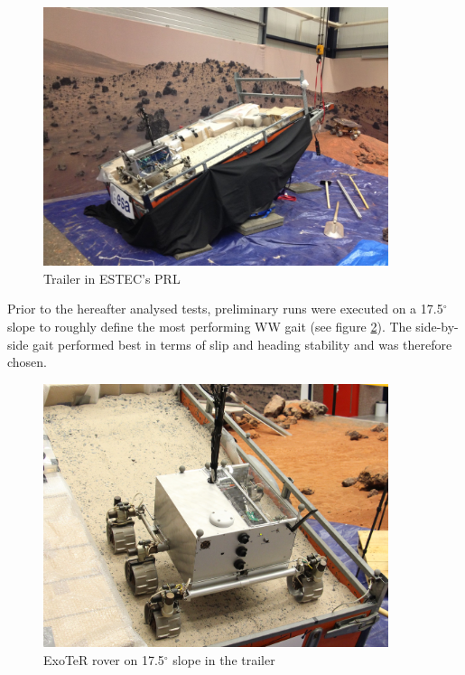 \documentclass[a4paper,twocolumn]{esapub2005} %
\begin{document}
\begin{figure}[h!]
    \centering
    \includegraphics[width=0.9\textwidth]{trailersetup.jpg}
    \caption{Trailer in ESTEC's PRL}
    \label{fig:trailer}
\end{figure}

Prior to the hereafter analysed tests, preliminary runs were executed on a
17.5$^{\circ}$ slope to roughly define the most performing WW gait (see figure \ref{fig:Exoslope}).  The side-by-side gait performed best in terms of slip and heading stability and was therefore chosen. 

\begin{figure}[h!]
    \centering
    \includegraphics[width=0.9\textwidth]{Exoslope.jpg}
    \caption{ExoTeR rover on 17.5$^{\circ}$ slope in the trailer}
    \label{fig:Exoslope}
\end{figure}
\end{document}
